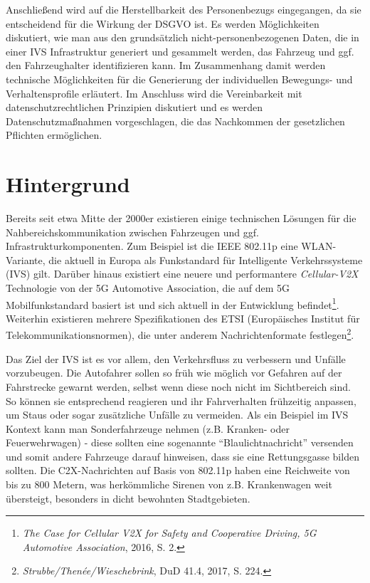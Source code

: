 Anschließend wird auf die Herstellbarkeit des Personenbezugs eingegangen, da sie entscheidend für die Wirkung der DSGVO ist. Es werden Möglichkeiten diskutiert, wie man aus den grundsätzlich nicht-personenbezogenen Daten, die in einer IVS Infrastruktur generiert und gesammelt werden, das Fahrzeug und ggf. den Fahrzeughalter identifizieren kann. Im Zusammenhang damit werden technische Möglichkeiten für die Generierung der individuellen Bewegungs- und Verhaltensprofile erläutert. Im Anschluss wird die Vereinbarkeit mit datenschutzrechtlichen Prinzipien diskutiert und es werden Datenschutzmaßnahmen vorgeschlagen, die das Nachkommen der gesetzlichen Pflichten ermöglichen.


\section{Hintergrund}
\label{ch:Background}

Bereits seit etwa Mitte der 2000er existieren einige technischen Lösungen für die Nahbereichskommunikation zwischen Fahrzeugen und ggf. Infrastrukturkomponenten. Zum Beispiel ist die IEEE 802.11p eine WLAN-Variante, die aktuell in Europa als Funkstandard für Intelligente Verkehrssysteme (IVS) gilt. Darüber hinaus existiert eine neuere und performantere \textit{Cellular-V2X} Technologie von der 5G Automotive Association, die auf dem 5G Mobilfunkstandard basiert ist und sich aktuell in der Entwicklung befindet\footnote{\emph{The Case for Cellular V2X for Safety and Cooperative Driving, 5G Automotive Association}, 2016, S. 2.}. \nocite{5GAA2016}Weiterhin existieren mehrere Spezifikationen des ETSI (Europäisches Institut für Telekommunikationsnormen), die unter anderem Nachrichtenformate festlegen\footnote{\emph{Strubbe/Thenée/Wieschebrink}, DuD 41.4, 2017, S. 224.}. \nocite{Strubbe2017}

Das Ziel der IVS ist es vor allem, den Verkehrsfluss zu verbessern und Unfälle vorzubeugen. Die Autofahrer sollen so früh wie möglich vor Gefahren auf der Fahrstrecke gewarnt werden, selbst wenn diese noch nicht im Sichtbereich sind. So können sie entsprechend reagieren und ihr Fahrverhalten frühzeitig anpassen, um Staus oder sogar zusätzliche Unfälle zu vermeiden. Als ein Beispiel im IVS Kontext kann man Sonderfahrzeuge nehmen (z.B. Kranken- oder Feuerwehrwagen) - diese sollten eine sogenannte ``Blaulichtnachricht''  versenden und somit andere Fahrzeuge darauf hinweisen, dass sie eine Rettungsgasse bilden sollten. Die C2X-Nachrichten auf Basis von 802.11p haben eine Reichweite von bis zu 800 Metern, was herkömmliche Sirenen von z.B. Krankenwagen weit übersteigt, besonders in dicht bewohnten Stadtgebieten.

